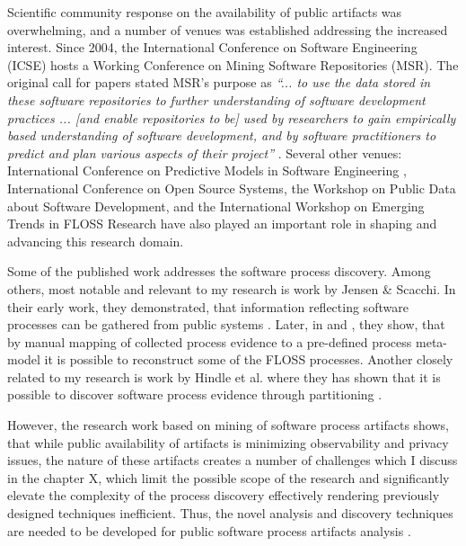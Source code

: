 Scientific community response on the availability of public artifacts was overwhelming, and a number of 
venues was established addressing the increased interest. 
Since 2004, the International Conference on Software Engineering (ICSE) hosts a Working Conference on 
Mining Software Repositories (MSR). The original call for papers stated MSR's purpose as 
\textit{``... to use the data stored in these software repositories to further understanding of software 
development practices ... [and enable repositories to be] used by researchers to gain empirically based 
understanding of software development, and by software practitioners to predict and plan various aspects 
of their project''} \cite{msr2004} \cite{citeulike:7853299}. 
Several other venues: International Conference on Predictive Models in Software Engineering \cite{promise12}, 
International Conference on Open Source Systems, the Workshop on Public Data about Software Development, 
and the International Workshop on Emerging Trends in FLOSS Research have also played
an important role in shaping and advancing this research domain.

Some of the published work addresses the software process discovery. Among others, most notable and 
relevant to my research is work by Jensen \& Scacchi. In their early work, they demonstrated, that 
information reflecting software processes can be gathered from public systems \cite{citeulike:12550640}. 
Later, in \cite{citeulike:5043664} and \cite{citeulike:5128808}, they show, that by manual mapping of 
collected process evidence to a pre-defined process meta-model it is possible to reconstruct some 
of the FLOSS processes. 
Another closely related to my research is work by Hindle et al. where they has shown that it is possible to 
discover software process evidence through partitioning \cite{citeulike:10377366}.

However, the research work based on mining of software process artifacts shows, that while public availability 
of artifacts is minimizing observability and privacy issues, the nature of these artifacts creates a number of 
challenges which I discuss in the chapter X, which limit the possible scope of the research and significantly 
elevate the complexity of the process discovery effectively rendering previously designed techniques inefficient.
Thus, the novel analysis and discovery techniques are needed to be developed for public software process artifacts 
analysis \cite{citeulike:7853299}.


